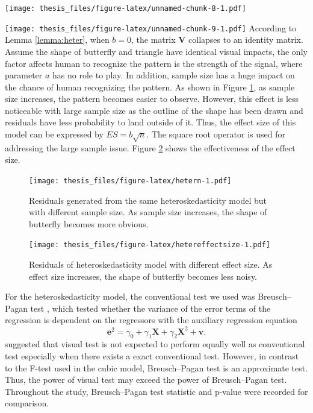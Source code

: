 \documentclass{monashthesis}
\theoremstyle{definition}
\theoremstyle{definition}
\theoremstyle{definition}
\theoremstyle{definition}
\theoremstyle{remark}
\begin{document}
\texttt{[image: thesis\_files/figure-latex/unnamed-chunk-8-1.pdf]}

\begin{Shaded}
\begin{Highlighting}[]
\SpecialCharTok{$}\SpecialCharTok{$}\NormalTok{(}\NormalTok{), } \NormalTok{)}
\end{Highlighting}
\end{Shaded}

\texttt{[image: thesis\_files/figure-latex/unnamed-chunk-9-1.pdf]}
According to Lemma \ref{lemma:heter}, when \(b = 0\), the matrix \(\boldsymbol{V}\) collapses to an identity matrix. Assume the shape of butterfly and triangle have identical visual impacts, the only factor affects human to recognize the pattern is the strength of the signal, where parameter \(a\) has no role to play. In addition, sample size has a huge impact on the chance of human recognizing the pattern. As shown in Figure \ref{fig:hetern}, as sample size increases, the pattern becomes easier to observe. However, this effect is less noticeable with large sample size as the outline of the shape has been drawn and residuals have less probability to land outside of it. Thus, the effect size of this model can be expressed by \(ES = b\sqrt{n}\). The square root operator is used for addressing the large sample issue. Figure \ref{fig:hetereffectsize} shows the effectiveness of the effect size.

\begin{figure}
\centering
\texttt{[image: thesis\_files/figure-latex/hetern-1.pdf]}
\caption{\label{fig:hetern}Residuals generated from the same heteroskedasticity model but with different sample size. As sample size increases, the shape of butterfly becomes more obvious.}
\end{figure}

\begin{figure}
\centering
\texttt{[image: thesis\_files/figure-latex/hetereffectsize-1.pdf]}
\caption{\label{fig:hetereffectsize}Residuals of heteroskedasticity model with different effect size. As effect size increases, the shape of butterfly becomes less noisy.}
\end{figure}

For the heteroskedasticity model, the conventional test we used was Breusch--Pagan test \autocite{breusch_simple_1979}, which tested whether the variance of the error terms of the regression is dependent on the regressors with the auxiliary regression equation \[\boldsymbol{e}^2 = \gamma_0 + \gamma_1 \boldsymbol{X} + \gamma_2 \boldsymbol{X}^2 + \boldsymbol{v}.\] \textcite{majumder_validation_2013} suggested that visual test is not expected to perform equally well as conventional test especially when there exists a exact conventional test. However, in contrast to the F-test used in the cubic model, Breusch--Pagan test is an approximate test. Thus, the power of visual test may exceed the power of Breusch--Pagan test. Throughout the study, Breusch--Pagan test statistic and p-value were recorded for comparison.
\end{document}
